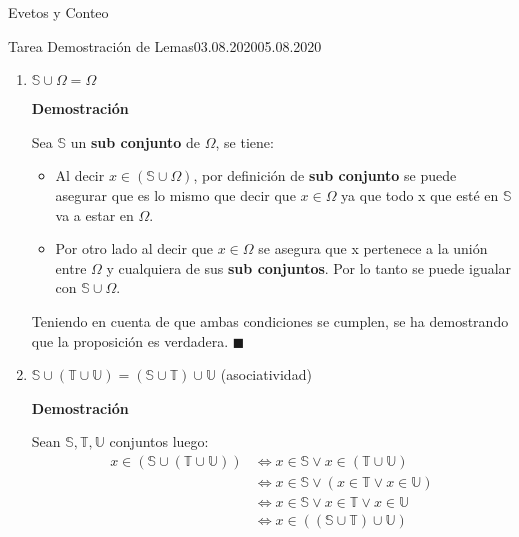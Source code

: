 \documentclass[a4paper]{book}
\begin{document}
\begin{chapter}{Evetos y Conteo}
\begin{tarea}{Tarea Demostración de Lemas}{03.08.2020}{05.08.2020}
\begin{enumerate}
                Ya que ambas situaciones son verdaderas se a demostrado
                verdadera a la proposición. $\blacksquare$

                \item $\mathbb S\cup \Omega = \Omega$

                \textbf{Demostración}

                Sea $\mathbb S$ un \textbf{sub conjunto} de $\Omega$, se tiene:

                \begin{itemize}
                    \item Al decir $x\in\left( \mathbb S\cup\Omega \right)$,
                        por definición de \textbf{sub conjunto} se puede
                        asegurar que es lo mismo que decir que $x\in\Omega$ ya
                        que todo x que esté en $\mathbb S$ va a estar en
                        $\Omega$.
                    \item Por otro lado al decir que $x\in\Omega$ se asegura
                        que x pertenece a la unión entre $\Omega$ y cualquiera
                        de sus \textbf{sub conjuntos}. Por lo tanto se puede
                        igualar con $\mathbb S\cup\Omega$.
                \end{itemize}

            Teniendo en cuenta de que ambas condiciones se cumplen, se ha
            demostrando que la proposición es verdadera. $\blacksquare$
            \np
                \item $\mathbb S\cup(\mathbb T\cup  \mathbb U) = (\mathbb S\cup
                    \mathbb T)\cup \mathbb U$ (asociatividad)

                \textbf{Demostración}

                Sean $\mathbb S,\mathbb T,\mathbb U$ conjuntos luego:
                \begin{equation*}
                \label{eq:1.15}
                \begin{split}
                    x\in\left( \mathbb S\cup\left( \mathbb T\cup\mathbb U
                    \right) \right) & \iff x\in\mathbb S\lor x\in\left( \mathbb
                    T\cup\mathbb U\right)\\
                    & \iff x\in\mathbb S\lor \left( x\in\mathbb T\lor x
                    \in\mathbb U \right)\\
                    & \iff x\in\mathbb S\lor x\in\mathbb T\lor x \in\mathbb U\\
                    & \iff x\in\left( \left( \mathbb S\cup \mathbb T
                    \right)\cup\mathbb U \right)\\
                \end{split}
                \end{equation*}


\end{enumerate}
\end{tarea}
\end{chapter}
\end{document}
